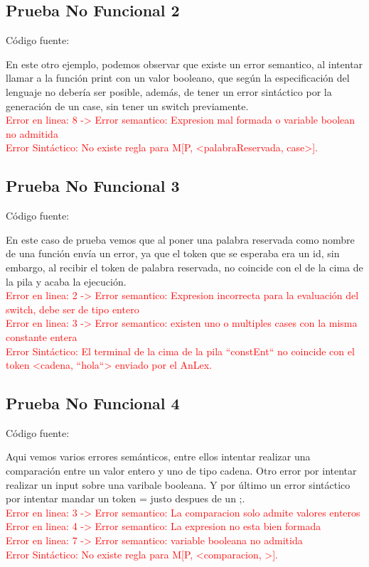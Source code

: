\documentclass{article}[a4paper]
\newcommand\tab[1][1cm]{\hspace*{#1}}
\begin{document}
\begin{appendices}
\subsection{Prueba No Funcional 2}
Código fuente:

En este otro ejemplo, podemos observar que existe un error semantico, al intentar llamar a la función print con un valor booleano, que según la especificación del lenguaje no debería ser posible, además, de tener un error sintáctico por la generación de un case, sin tener un switch previamente.\\
\tab \textcolor{red}{Error en linea: 8 -> Error semantico: Expresion mal formada o variable boolean no admitida}\\
\tab \textcolor{red}{Error Sintáctico: No existe regla para M[P, <palabraReservada, case>].}

\subsection{Prueba No Funcional 3}
Código fuente:

En este caso de prueba vemos que al poner una palabra reservada como nombre de una función envía un error, ya que el token que se esperaba era un id, sin embargo, al recibir el token de palabra reservada, no coincide con el de la cima de la pila y acaba la ejecución.\\
\tab \textcolor{red}{Error en linea: 2 -> Error semantico: Expresion incorrecta para la evaluación del switch, debe ser de tipo entero}\\
\tab \textcolor{red}{Error en linea: 3 -> Error semantico: existen uno o multiples cases con la misma constante entera}\\
\tab \textcolor{red}{Error Sintáctico: El terminal de la cima de la pila ``constEnt`` no coincide con el token <cadena, ``hola``> enviado por el AnLex.}

\subsection{Prueba No Funcional 4}
Código fuente:

Aqui vemos varios errores semánticos, entre ellos intentar realizar una comparación entre un valor entero y uno de tipo cadena. Otro error por intentar realizar un input sobre una varibale booleana. Y por último un error sintáctico por intentar mandar un token = justo despues de un ;.\\
\tab \textcolor{red}{Error en linea: 3 -> Error semantico: La comparacion solo admite valores enteros}\\
\tab \textcolor{red}{Error en linea: 4 -> Error semantico: La expresion no esta bien formada}\\
\tab \textcolor{red}{Error en linea: 7 -> Error semantico: variable booleana no admitida}\\
\tab \textcolor{red}{Error Sintáctico: No existe regla para M[P, <comparacion, >].}


\end{appendices}
\end{document}
